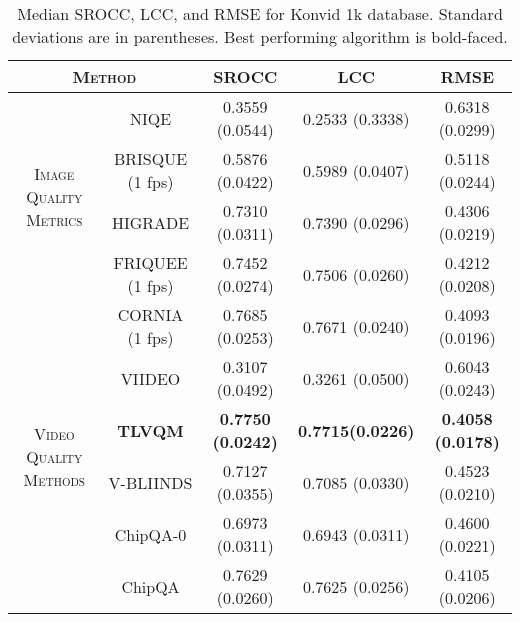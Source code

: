 \documentclass[journal]{IEEEtran}
\begin{document}
\begin{table*}
\caption{Median SROCC, LCC, and RMSE for Konvid 1k database. Standard deviations are in parentheses. Best performing algorithm is bold-faced.}
\begin{center}
\begin{tabular}{|c|c|c|c|c|}
\hline
\multicolumn{2}{|c|}{\textsc{Method}}  &  SROCC & LCC & RMSE  \\  
\hline
\multirow{4}{*}{\textsc{Image Quality Metrics}} & NIQE\cite{niqe} & 0.3559 \scriptsize(0.0544) & 0.2533 \scriptsize(0.3338) & 0.6318 \scriptsize(0.0299) \\
\cline{2-5}
& BRISQUE\cite{brisque} (1 fps) &  0.5876{ \scriptsize(0.0422)} & 0.5989{ \scriptsize(0.0407)} & 0.5118{ \scriptsize(0.0244)}   \\
\cline{2-5}
& HIGRADE\cite{higrade} & 0.7310{ \scriptsize(0.0311)} & 0.7390{ \scriptsize(0.0296)} & 0.4306{ \scriptsize(0.0219)} \\
\cline{2-5}
& FRIQUEE\cite{friquee} (1 fps) & 0.7452{ \scriptsize(0.0274)} & 0.7506{ \scriptsize(0.0260)} & 0.4212{ \scriptsize(0.0208)} \\
\cline{2-5}
& CORNIA\cite{cornia} (1 fps) & 0.7685{ \scriptsize(0.0253)} & 0.7671{ \scriptsize(0.0240)} & 0.4093{ \scriptsize(0.0196)} \\
\hline
\multirow{4}{*}{\textsc{Video Quality Methods}} & VIIDEO\cite{viideo} & 0.3107{ \scriptsize(0.0492)} & 0.3261{ \scriptsize(0.0500)} & 0.6043{ \scriptsize(0.0243)} \\ 
\cline{2-5}
& \textbf{TLVQM}\cite{tlvqm} &  \textbf{0.7750{ \scriptsize(0.0242)}} & \textbf{0.7715{\scriptsize(0.0226)}} & \textbf{0.4058{ \scriptsize(0.0178)}}\\
\cline{2-5}
& V-BLIINDS\cite{vbliinds} & 0.7127{ \scriptsize(0.0355)} & 0.7085{ \scriptsize(0.0330)} & 0.4523{ \scriptsize(0.0210)} \\
\cline{2-5}
& ChipQA-0\cite{chipqa0} & 0.6973 \scriptsize(0.0311) & 0.6943 \scriptsize(0.0311) & 0.4600 \scriptsize(0.0221) \\
\cline{2-5}
& ChipQA & 0.7629 \scriptsize(0.0260) & 0.7625 \scriptsize(0.0256) & 0.4105 \scriptsize(0.0206) \\
\hline
\end{tabular}
\label{tab:konvid}
\end{center}
\vspace{-5mm}
\end{table*}
\end{document}
